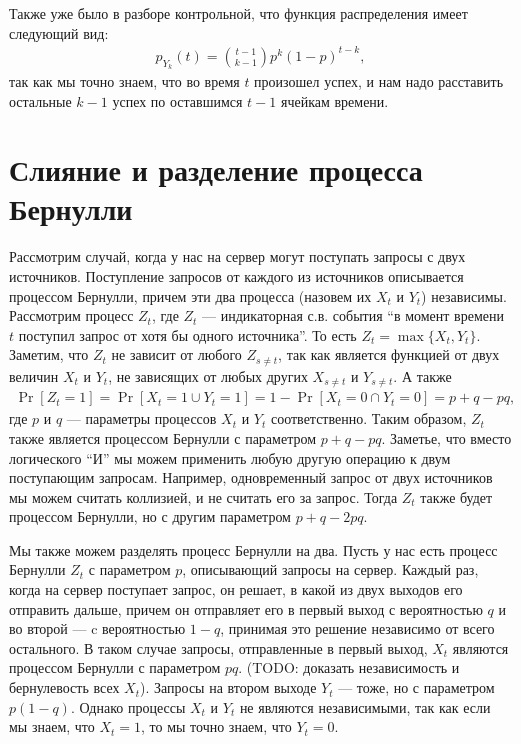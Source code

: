 \documentclass[12pt]{article}
\begin{document}
Также уже было в разборе контрольной, что функция распределения имеет следующий вид:
\begin{align*}
  p_{Y_k}(t) = \binom{t - 1}{k - 1} p^k (1 - p)^{t - k},
\end{align*}
так как мы точно знаем, что во время $t$ произошел успех, и нам надо расставить остальные $k - 1$ успех по оставшимся $t - 1$ ячейкам времени.

\section{Слияние и разделение процесса Бернулли}

Рассмотрим случай, когда у нас на сервер могут поступать запросы с двух источников. Поступление запросов от каждого из источников описывается процессом Бернулли, причем эти два процесса (назовем их $X_t$ и $Y_t$) независимы. Рассмотрим процесс $Z_t$, где $Z_t$ --- индикаторная с.в. события ``в момент времени $t$ поступил запрос от хотя бы одного источника''. То есть $Z_t = \max\{X_t, Y_t\}$. Заметим, что $Z_t$ не зависит от любого $Z_{s \ne t}$, так как является функцией от двух величин $X_t$ и $Y_t$, не зависящих от любых других $X_{s \ne t}$ и $Y_{s \ne t}$. А также 
\begin{align*}
  \Pr[Z_t = 1] = \Pr[X_t = 1 \cup Y_t = 1] = 1 - \Pr[X_t = 0 \cap Y_t = 0] = p + q - pq,
\end{align*}
где $p$ и $q$ --- параметры процессов $X_t$ и $Y_t$ соответственно. Таким образом, $Z_t$ также является процессом Бернулли с параметром $p + q - pq$. Заметье, что вместо логического ``И'' мы можем применить любую другую операцию к двум поступающим запросам. Например, одновременный запрос от двух источников мы можем считать коллизией, и не считать его за запрос. Тогда $Z_t$ также будет процессом Бернулли, но с другим параметром $p + q - 2pq$.

Мы также можем разделять процесс Бернулли на два. Пусть у нас есть процесс Бернулли $Z_t$ с параметром $p$, описывающий запросы на сервер. Каждый раз, когда на сервер поступает запрос, он решает, в какой из двух выходов его отправить дальше, причем он отправляет его в первый выход с вероятностью $q$  и во второй --- c вероятностью $1 - q$, принимая это решение независимо от всего остального. В таком случае запросы, отправленные в первый выход, $X_t$ являются процессом Бернулли с параметром $pq$. (TODO: доказать независимость и бернулевость всех $X_t$). Запросы на втором выходе $Y_t$ --- тоже, но с параметром $p(1 - q)$. Однако процессы $X_t$ и $Y_t$ не являются независимыми, так как если мы знаем, что $X_t = 1$, то мы точно знаем, что $Y_t = 0$.
\end{document}
